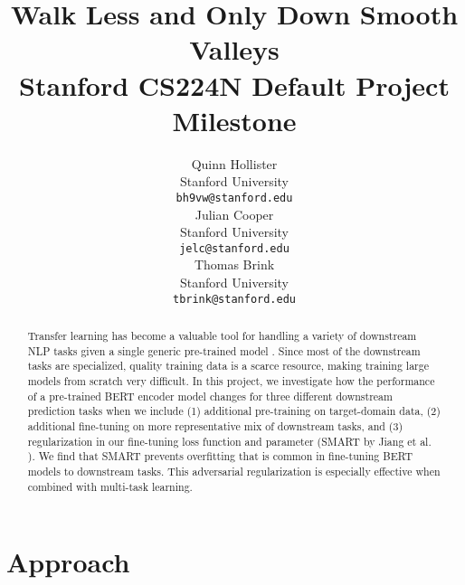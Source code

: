 \documentclass{article}
\title{
  Walk Less and Only Down Smooth Valleys \\
  \vspace{0.15cm}
  \small{\normalfont Stanford CS224N Default Project Milestone}  %
}
\author{
  Quinn Hollister \\
  Stanford University \\
  \texttt{bh9vw@stanford.edu} \\
   \And
    Julian Cooper \\
  Stanford University \\
  \texttt{jelc@stanford.edu} \\
   \And
   Thomas Brink \\
  Stanford University \\
  \texttt{tbrink@stanford.edu} \\
}
\begin{document}
\maketitle
\vspace{-0.4cm}
\begin{abstract}
  Transfer learning has become a valuable tool for handling a variety of downstream NLP tasks given a single generic pre-trained model \cite{weiss2016survey}. Since most of the downstream tasks are specialized, quality training data is a scarce resource, making training large models from scratch very difficult. 
  In this project, we investigate how the performance of a pre-trained BERT encoder model changes for three different downstream prediction tasks when we include (1) additional pre-training on target-domain data, (2) additional fine-tuning on more representative mix of downstream tasks, and (3) regularization in our fine-tuning loss function and parameter (SMART by Jiang et al. \cite{smart}). 
  We find that SMART prevents overfitting that is common in fine-tuning BERT models to downstream tasks. This adversarial regularization is especially effective when combined with multi-task learning. 
\end{abstract}
\vspace{-0.5cm}

\section{Approach}
\end{document}
